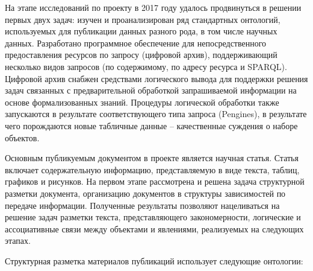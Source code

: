 \documentclass[a4paper,12pt,openany,final]{extreport}
\begin{document}
На этапе исследований по проекту в 2017 году удалось продвинуться в
решении первых двух задач: изучен и проанализирован ряд стандартных
онтологий, используемых для публикации данных разного рода, в том числе
научных данных. Разработано программное обеспечение для
непосредственного предоставления ресурсов по запросу (цифровой архив),
поддерживающий несколько видов запросов (по содержимому, по адресу
ресурса и SPARQL). Цифровой архив снабжен средствами логического вывода
для поддержки решения задач связанных с предварительной обработкой
запрашиваемой информации на основе формализованных знаний. Процедуры
логической обработки также запускаются в результате соответствующего
типа запроса (Pengines), в результате чего порождаются новые табличные
данные -- качественные суждения о наборе объектов.

Основным публикуемым документом в проекте является научная статья.
Статья включает содержательную информацию, представляемую в виде текста,
таблиц, графиков и рисунков. На первом этапе рассмотрена и решена задача
структурной разметки документа, организацию документов в структуры
зависимостей по передаче информации. Полученные результаты позволяют
нацеливаться на решение задач разметки текста, представляющего
закономерности, логические и ассоциативные связи между объектами и
явлениями, реализуемых на следующих этапах.

Структурная разметка материалов публикаций использует следующие
онтологии:
\end{document}
